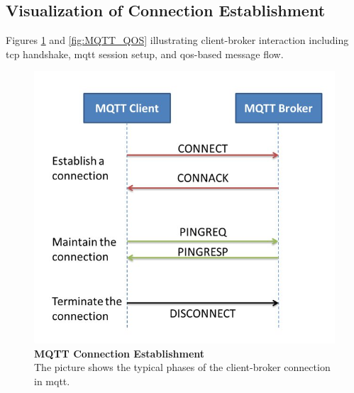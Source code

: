 \documentclass[12pt, english, openany]{book}
\begin{document}
\subsection{Visualization of Connection Establishment}

Figures \ref{fig:MQTT_CONN} and \ref{fig:MQTT_QOS} illustrating client-broker interaction including \gls{tcp} handshake, \gls{mqtt} session setup, and \gls{qos}-based message flow.

\begin{figure}[htbp]
    \centering
    \includegraphics[width=1\textwidth]{MQTT_CONN.jpg}
    \caption{
        \textbf{MQTT Connection Establishment} \\
        The picture shows the typical phases of the client-broker connection in \gls{mqtt}. \parencite{MQTT}
    }
    \label{fig:MQTT_CONN}
\end{figure}
\end{document}
